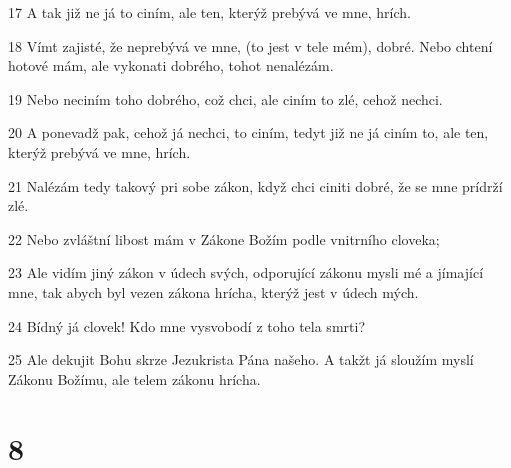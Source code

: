 \par 17 A tak již ne já to ciním, ale ten, kterýž prebývá ve mne, hrích.
\par 18 Vímt zajisté, že neprebývá ve mne, (to jest v tele mém), dobré. Nebo chtení hotové mám, ale vykonati dobrého, tohot nenalézám.
\par 19 Nebo neciním toho dobrého, což chci, ale ciním to zlé, cehož nechci.
\par 20 A ponevadž pak, cehož já nechci, to ciním, tedyt již ne já ciním to, ale ten, kterýž prebývá ve mne, hrích.
\par 21 Nalézám tedy takový pri sobe zákon, když chci ciniti dobré, že se mne prídrží zlé.
\par 22 Nebo zvláštní libost mám v Zákone Božím podle vnitrního cloveka;
\par 23 Ale vidím jiný zákon v údech svých, odporující zákonu mysli mé a jímající mne, tak abych byl vezen zákona hrícha, kterýž jest v údech mých.
\par 24 Bídný já clovek! Kdo mne vysvobodí z toho tela smrti?
\par 25 Ale dekujit Bohu skrze Jezukrista Pána našeho. A takžt já sloužím myslí Zákonu Božímu, ale telem zákonu hrícha.

\chapter{8}

